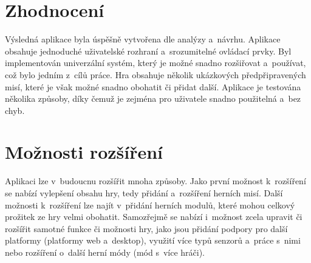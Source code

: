 \section{Zhodnocení}

Výsledná aplikace \myAppName{} byla úspěšně vytvořena dle analýzy a~návrhu.
Aplikace obsahuje jednoduché uživatelské rozhraní a~srozumitelné ovládací prvky.
Byl implementován univerzální systém,
který je možné snadno rozšiřovat a~používat,
což bylo jedním z~cílů práce.
Hra obsahuje několik ukázkových předpřipravených misí,
které je však možné snadno obohatit či přidat další.
Aplikace je testována několika způsoby,
díky čemuž je zejména pro uživatele snadno použitelná a~bez chyb.

\section{Možnosti rozšíření}

Aplikaci lze v~budoucnu rozšířit mnoha způsoby.
Jako první možnost k~rozšíření se nabízí vylepšení obsahu hry,
tedy přidání a~rozšíření herních misí.
Další možnosti k~rozšíření lze najít v~přidání herních modulů,
které mohou celkový prožitek ze hry velmi obohatit.
Samozřejmě se nabízí i~možnost zcela upravit či rozšířit samotné funkce či
možnosti hry,
jako jsou přidání podpory pro další platformy (platformy web a~desktop),
využití více typů senzorů a~práce s~nimi
nebo rozšíření o~další herní módy (mód s~více hráči). 
